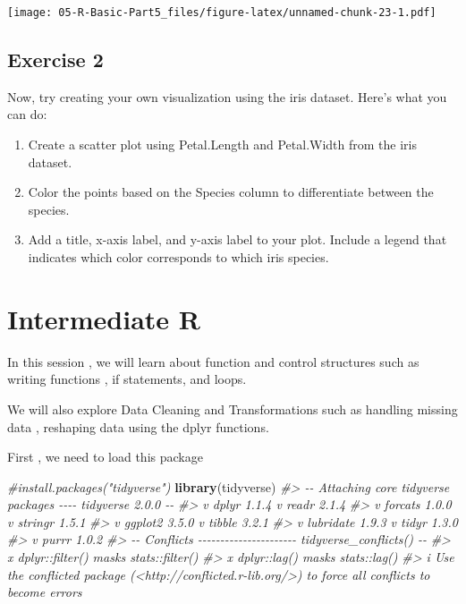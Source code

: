 \documentclass[
]{book}
\newenvironment{Shaded}{\begin{snugshade}}{\end{snugshade}}
\newcommand{\CommentTok}[1]{\textcolor[rgb]{0.56,0.35,0.01}{\textit{#1}}}
\newcommand{\FunctionTok}[1]{\textcolor[rgb]{0.13,0.29,0.53}{\textbf{#1}}}
\newcommand{\NormalTok}[1]{#1}
\providecommand{\tightlist}{%
  \setlength{\itemsep}{0pt}\setlength{\parskip}{0pt}}
\begin{document}
\texttt{[image: 05-R-Basic-Part5\_files/figure-latex/unnamed-chunk-23-1.pdf]}

\section*{Exercise 2}\label{exercise-2-2}

Now, try creating your own visualization using the iris dataset. Here's what you can do:

\begin{enumerate}
\def\labelenumi{\arabic{enumi}.}
\tightlist
\item
  Create a scatter plot using Petal.Length and Petal.Width from the iris dataset.
\item
  Color the points based on the Species column to differentiate between the species.
\item
  Add a title, x-axis label, and y-axis label to your plot.
  Include a legend that indicates which color corresponds to which iris species.
\end{enumerate}

\chapter*{Intermediate R}\label{intermediate-r}

In this session , we will learn about function and control structures such as writing functions , if statements, and loops.

We will also explore Data Cleaning and Transformations such as handling missing data , reshaping data using the dplyr functions.

First , we need to load this package

\begin{Shaded}
\begin{Highlighting}[]
\CommentTok{\#install.packages("tidyverse")}
\FunctionTok{library}\NormalTok{(tidyverse)}
\CommentTok{\#\textgreater{} {-}{-} Attaching core tidyverse packages {-}{-}{-}{-} tidyverse 2.0.0 {-}{-}}
\CommentTok{\#\textgreater{} v dplyr     1.1.4     v readr     2.1.4}
\CommentTok{\#\textgreater{} v forcats   1.0.0     v stringr   1.5.1}
\CommentTok{\#\textgreater{} v ggplot2   3.5.0     v tibble    3.2.1}
\CommentTok{\#\textgreater{} v lubridate 1.9.3     v tidyr     1.3.0}
\CommentTok{\#\textgreater{} v purrr     1.0.2     }
\CommentTok{\#\textgreater{} {-}{-} Conflicts {-}{-}{-}{-}{-}{-}{-}{-}{-}{-}{-}{-}{-}{-}{-}{-}{-}{-}{-}{-}{-}{-} tidyverse\_conflicts() {-}{-}}
\CommentTok{\#\textgreater{} x dplyr::filter() masks stats::filter()}
\CommentTok{\#\textgreater{} x dplyr::lag()    masks stats::lag()}
\CommentTok{\#\textgreater{} i Use the conflicted package (\textless{}http://conflicted.r{-}lib.org/\textgreater{}) to force all conflicts to become errors}
\end{Highlighting}
\end{Shaded}
\end{document}
